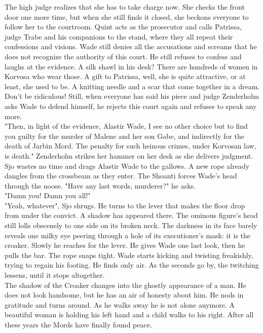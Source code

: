 The high judge realizes that she has to take charge now. She checks the front door one more time, but when she still finds it closed, she beckons everyone to follow her to the courtroom. Quint acts as the prosecutor and calls Patrissa, judge Trabe and his companions to the stand, where they all repeat their confessions and visions. Wade still denies all the accusations and screams that he does not recognize the authority of this court. He still refuses to confess and laughs at the evidence. A silk shawl in his desk? There are hundreds of women in Korvosa who wear those. A gift to Patrissa, well, she is quite attractive, or at least, she used to be. A knitting needle and a scar that come together in a dream. Don't be ridiculous! Still, when everyone has said his piece and judge Zenderholm asks Wade to defend himself, he rejects this court again and refuses to speak any more.\\

"Then, in light of the evidence, Alastir Wade, I see no other choice but to find you guilty for the murder of Malene and her son Gabe, and indirectly for the death of Jarbin Mord. The penalty for such heinous crimes, under Korvosan law, is death." Zenderholm strikes her hammer on her desk as she delivers judgment.\\

Sjo wastes no time and drags Alastir Wade to the gallows. A new rope already dangles from the crossbeam as they enter. The Shoanti forces Wade's head through the noose. "Have any last words, murderer?" he asks.\\

"Damn you! Damn you all!"\\

"Yeah, whatever", Sjo shrugs. He turns to the lever that makes the floor drop from under the convict. A shadow has appeared there. The ominous figure's head still lolls obscenely to one side on its broken neck. The darkness in its face barely reveals one milky eye peering through a hole of its executioner's mask: it is the croaker. Slowly he reaches for the lever. He gives Wade one last look, then he pulls the bar. The rope snaps tight. Wade starts kicking and twisting freakishly, trying to regain his footing. He finds only air. As the seconds go by, the twitching lessens, until it stops altogether.\\

The shadow of the Croaker changes into the ghostly appearance of a man. He does not look handsome, but he has an air of honesty about him. He nods in gratitude and turns around. As he walks away he is not alone anymore. A beautiful woman is holding his left hand and a child walks to his right. After all these years the Mords have finally found peace.\\

